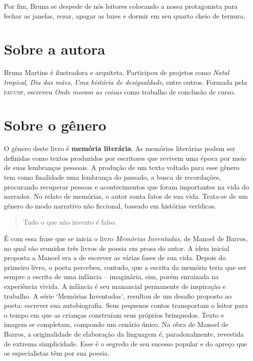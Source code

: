 \documentclass[11pt]{extarticle}
\begin{document}
Por fim, Bruna se despede de nós leitores colocando a nossa protagonista para fechar as janelas, rezar, apagar as luzes e dormir em seu quarto cheio de ternura. 

\section{Sobre a autora}

Bruna Martins é ilustradora e arquiteta. Participou de projetos como \textit{Natal tropical}, \textit{Dia das mães}, \textit{Uma história de desigualdade}, entre outros. Formada pela \textsc{fauusp}, escreveu \textit{Onde moram as coisas} como trabalho de conclusão de curso.

\section{Sobre o gênero}

O gênero deste livro é \textbf{memória literária}. 
As memórias literárias podem ser definidas como textos produzidos por escritores que revivem uma época por meio de suas lembranças pessoais. A produção de um texto voltado para esse gênero tem como finalidade uma lembrança do passado, a busca de recordações, procurando recuperar pessoas e acontecimentos que foram importantes na vida do narrador. No relato de memórias, o autor conta fatos de sua vida. Trata-se de um gênero do modo narrativo não ficcional, baseado em histórias verídicas.

\begin{quote}

Tudo o que não invento é falso.

\end{quote}

É com essa frase que se inicia o livro \textit{Memórias Inventadas}, de Manoel de Barros, no qual são reunidos três livros de poesia em prosa do autor. A ideia inicial proposta a Manoel era a de escrever as várias fases de sua vida. Depois do primeiro livro, o poeta percebeu, contudo, que a escrita da memória teria que ser sempre a escrita de uma infância – imaginária, sim, porém enraizada na experiência vivida. A infância é seu manancial permanente de inspiração e trabalho. A série `Memórias Inventadas', resultou de um desafio proposto ao poeta: escrever sua autobiografia. Seus pequenos contos transportam o leitor para o tempo em que as crianças construíam seus próprios brinquedos. Texto e imagem se completam, compondo um cenário único. Na obra de Manoel de Barros, a originalidade de elaboração da linguagem é, paradoxalmente, revestida de extrema simplicidade. Esse é o segredo de seu sucesso popular e do apreço que os especialistas têm por sua poesia.
\end{document}
